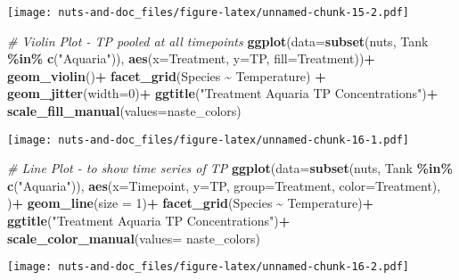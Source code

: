 \documentclass[
]{article}
\newenvironment{Shaded}{\begin{snugshade}}{\end{snugshade}}
\newcommand{\AttributeTok}[1]{\textcolor[rgb]{0.13,0.29,0.53}{#1}}
\newcommand{\CommentTok}[1]{\textcolor[rgb]{0.56,0.35,0.01}{\textit{#1}}}
\newcommand{\DecValTok}[1]{\textcolor[rgb]{0.00,0.00,0.81}{#1}}
\newcommand{\FunctionTok}[1]{\textcolor[rgb]{0.13,0.29,0.53}{\textbf{#1}}}
\newcommand{\NormalTok}[1]{#1}
\newcommand{\SpecialCharTok}[1]{\textcolor[rgb]{0.81,0.36,0.00}{\textbf{#1}}}
\newcommand{\StringTok}[1]{\textcolor[rgb]{0.31,0.60,0.02}{#1}}
\begin{document}
\texttt{[image: nuts-and-doc\_files/figure-latex/unnamed-chunk-15-2.pdf]}

\begin{Shaded}
\begin{Highlighting}[]
\CommentTok{\# Violin Plot {-} TP pooled at all timepoints}
\FunctionTok{ggplot}\NormalTok{(}\AttributeTok{data=}\FunctionTok{subset}\NormalTok{(nuts, Tank }\SpecialCharTok{\%in\%} \FunctionTok{c}\NormalTok{(}\StringTok{"Aquaria"}\NormalTok{)), }\FunctionTok{aes}\NormalTok{(}\AttributeTok{x=}\NormalTok{Treatment, }\AttributeTok{y=}\NormalTok{TP, }\AttributeTok{fill=}\NormalTok{Treatment))}\SpecialCharTok{+}
  \FunctionTok{geom\_violin}\NormalTok{()}\SpecialCharTok{+}
  \FunctionTok{facet\_grid}\NormalTok{(Species }\SpecialCharTok{\textasciitilde{}}\NormalTok{ Temperature) }\SpecialCharTok{+}
  \FunctionTok{geom\_jitter}\NormalTok{(}\AttributeTok{width=}\DecValTok{0}\NormalTok{)}\SpecialCharTok{+}
  \FunctionTok{ggtitle}\NormalTok{(}\StringTok{"Treatment Aquaria TP Concentrations"}\NormalTok{)}\SpecialCharTok{+}
  \FunctionTok{scale\_fill\_manual}\NormalTok{(}\AttributeTok{values=}\NormalTok{naste\_colors)}
\end{Highlighting}
\end{Shaded}

\texttt{[image: nuts-and-doc\_files/figure-latex/unnamed-chunk-16-1.pdf]}

\begin{Shaded}
\begin{Highlighting}[]
\CommentTok{\# Line Plot {-} to show time series of TP}
\FunctionTok{ggplot}\NormalTok{(}\AttributeTok{data=}\FunctionTok{subset}\NormalTok{(nuts, Tank }\SpecialCharTok{\%in\%} \FunctionTok{c}\NormalTok{(}\StringTok{"Aquaria"}\NormalTok{)), }\FunctionTok{aes}\NormalTok{(}\AttributeTok{x=}\NormalTok{Timepoint, }\AttributeTok{y=}\NormalTok{TP, }\AttributeTok{group=}\NormalTok{Treatment, }\AttributeTok{color=}\NormalTok{Treatment), )}\SpecialCharTok{+}
  \FunctionTok{geom\_line}\NormalTok{(}\AttributeTok{size =} \DecValTok{1}\NormalTok{)}\SpecialCharTok{+}
  \FunctionTok{facet\_grid}\NormalTok{(Species }\SpecialCharTok{\textasciitilde{}}\NormalTok{ Temperature)}\SpecialCharTok{+}
  \FunctionTok{ggtitle}\NormalTok{(}\StringTok{"Treatment Aquaria TP Concentrations"}\NormalTok{)}\SpecialCharTok{+}
  \FunctionTok{scale\_color\_manual}\NormalTok{(}\AttributeTok{values=}\NormalTok{ naste\_colors)}
\end{Highlighting}
\end{Shaded}

\texttt{[image: nuts-and-doc\_files/figure-latex/unnamed-chunk-16-2.pdf]}
\end{document}
